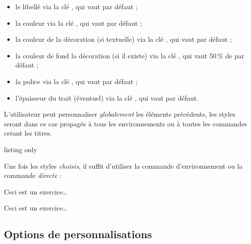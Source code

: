\documentclass[french,11pt,a4paper]{article}
\begin{document}
\begin{itemize}
	\item le libellé via la clé \MontreCode{[Libelle]}, qui vaut  par défaut ;
	\item la couleur via la clé \MontreCode{[Couleur]}, qui vaut  par défaut ;
	\item la couleur de la décoration (si textuelle) via la clé \MontreCode{[CouleurDeco]}, qui vaut  par défaut ;
	\item la couleur de fond la décoration (si il existe) via la clé \MontreCode{[CouleurFondDeco]}, qui vaut 50\,\% de  par défaut ;
	\item la police via la clé \MontreCode{[Police]}, qui vaut  par défaut ;
	\item l'épaisseur du trait (éventuel) via la clé \MontreCode{[EpTrait]}, qui vaut \MontreCode{1.1pt} par défaut.
\end{itemize}

L'utilisateur peut personnaliser \textit{globalement} les éléments précédents, les styles seront dans ce cas propagés à tous les environnements ou à toutes les commandes créant les titres.

\begin{DemoCode}{listing only}
\StyleEnvtExo[clés]

\StyleEnvtExoDefaut
\end{DemoCode}

Une fois les styles \textit{choisis}, il suffit d'utiliser la commande d'environnement ou la commande \textit{directe} :

\begin{DemoCode}{}
\begin{EnvtExo}
Ceci est un exercice\ldots
\end{EnvtExo}
\end{DemoCode}

\begin{DemoCode}{}
\TitreExo

Ceci est un exercice\ldots
\end{DemoCode}

\subsection{Options de personnalisations}
\end{document}
